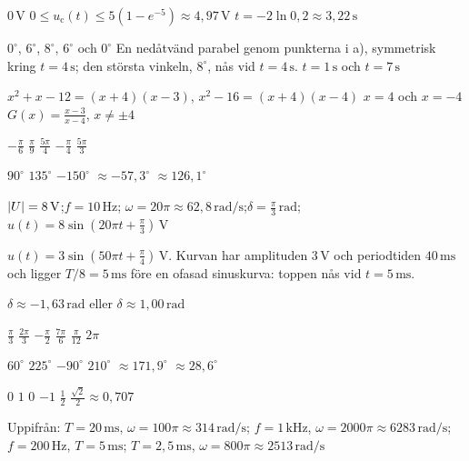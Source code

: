 
\begin{facit}

  $0\,\text{V}$
 $0 \leq u_{\text{c}}(t) \leq 5(1 - e^{-5}) \approx 4{,}97\,\text{V}$
 $t = -2\ln 0{,}2 \approx 3{,}22\,\text{s}$

  $0^{\circ}$, $6^{\circ}$, $8^{\circ}$, $6^{\circ}$ och $0^{\circ}$
 En nedåtvänd parabel genom punkterna i a), symmetrisk kring $t = 4\,\text{s}$; den största
vinkeln, $8^{\circ}$, nås vid $t = 4\,\text{s}$.
 $t = 1\,\text{s}$ och $t = 7\,\text{s}$

  $x^2 + x - 12 = (x + 4)(x - 3)$, $x^2 - 16 = (x + 4)(x - 4)$
 $x = 4$ och $x = -4$
 $G(x) = \frac{x - 3}{x - 4}$, $x \neq \pm 4$

  $-\frac{\pi}{6}$  $\frac{\pi}{9}$  $\frac{5\pi}{4}$
 $-\frac{\pi}{4}$  $\frac{5\pi}{3}$

  $90^{\circ}$  $135^{\circ}$  $-150^{\circ}$
 $\approx -57{,}3^{\circ}$  $\approx 126{,}1^{\circ}$

 $\lvert U\rvert = 8\,\text{V}$;\enspace $f = 10\,\text{Hz}$;\enspace
$\omega = 20\pi \approx 62{,}8\,\text{rad/s}$;\enspace $\delta = \frac{\pi}{3}\,\text{rad}$;\enspace
$u(t) = 8\sin(20\pi t + \frac{\pi}{3})\,\text{V}$

 $u(t) = 3\sin(50\pi t + \frac{\pi}{4})\,\text{V}$. Kurvan har amplituden $3\,\text{V}$
och periodtiden $40\,\text{ms}$ och ligger $T/8 = 5\,\text{ms}$ före en ofasad sinuskurva: toppen
nås vid $t = 5\,\text{ms}$.

 $\delta \approx -1{,}63\,\text{rad}$ eller $\delta \approx 1{,}00\,\text{rad}$

  $\frac{\pi}{3}$  $\frac{2\pi}{3}$  $-\frac{\pi}{2}$
 $\frac{7\pi}{6}$  $\frac{\pi}{12}$  $2\pi$

  $60^{\circ}$  $225^{\circ}$  $-90^{\circ}$  $210^{\circ}$
 $\approx 171{,}9^{\circ}$  $\approx 28{,}6^{\circ}$

  $0$  $1$  $0$  $-1$  $\frac{1}{2}$
 $\frac{\sqrt{2}}{2} \approx 0{,}707$

 Uppifrån: $T = 20\,\text{ms}$, $\omega = 100\pi \approx 314\,\text{rad/s}$;\enspace
$f = 1\,\text{kHz}$, $\omega = 2000\pi \approx 6283\,\text{rad/s}$;\enspace
$f = 200\,\text{Hz}$, $T = 5\,\text{ms}$;\enspace
$T = 2{,}5\,\text{ms}$, $\omega = 800\pi \approx 2513\,\text{rad/s}$


\end{facit}
